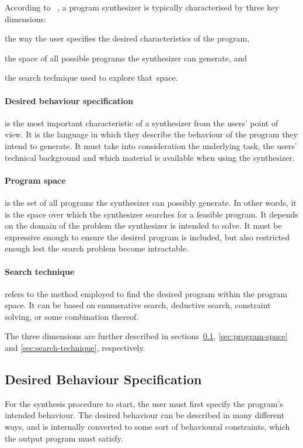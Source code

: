 According to \citeauthor{PSnow}~\cite{DBLP:conf/ppdp/Gulwani10,PSnow}, a program synthesizer is typically characterised by three key dimensions:
\begin{enumerate*}[label=(\roman*)]
  \item the way the user specifies the desired characteristics of the program,
  \item the space of all possible programs the synthesizer can generate, and
  \item the search technique used to explore that~space.
\end{enumerate*}

\paragraph{Desired behaviour specification} is the most important characteristic of a synthesizer from the users' point of view.
It is the language in which they describe the behaviour of the program they intend to generate. 
It must take into consideration the underlying task, the users' technical background and which material is available when using the synthesizer.

\paragraph{Program space} is the set of all programs the synthesizer can possibly generate. In other words, it is the space over which the synthesizer searches for a feasible program. It depends on the domain of the problem the synthesizer is intended to solve. It must be expressive enough to ensure the desired program is included, but also restricted enough lest the search problem become intractable.

\paragraph{Search technique} refers to the method employed to find the desired program within the program space. It can be based on enumerative search, deductive search, constraint solving, or some combination thereof.

\medskip

\noindent
The three dimensions are further described in sections~\ref{sec:desired-behaviour-spec}, \ref{sec:program-space} and \ref{sec:search-technique}, respectively.

\subsection{Desired Behaviour Specification} \label{sec:desired-behaviour-spec}
For the synthesis procedure to start, the user must first specify the program's intended behaviour. The desired behaviour can be described in many different ways, and is internally converted to some sort of behavioural constraints, which the output program must satisfy.

